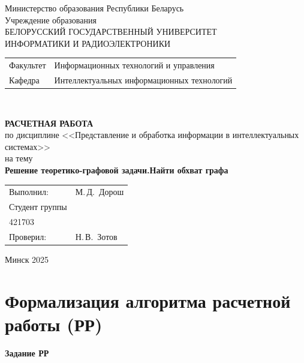\documentclass{article}
\begin{document}
\begin{titlepage}

  \begin{center}

    \vspace{6cm}
      Министерство образования Республики Беларусь\\[1em]
    Учреждение образования\\
    БЕЛОРУССКИЙ ГОСУДАРСТВЕННЫЙ УНИВЕРСИТЕТ \\
    ИНФОРМАТИКИ И РАДИОЭЛЕКТРОНИКИ\\[1em]

  \begin{minipage}{\textwidth}
      \begin{flushleft}
        \begin{tabular}{ l l }
          Факультет & Информационных технологий и управления\\
          Кафедра   & Интеллектуальных информационных технологий
        \end{tabular}
      \end{flushleft}
    \end{minipage}\\[1em]

    
    \vspace{5em}


    \textbf{РАСЧЕТНАЯ РАБОТА}\\
    {по дисциплине <<Представление и обработка информации в интеллектуальных системах>>}\\
    на тему\\
    \textbf{\large Решение теоретико-графовой задачи.Найти обхват графа}\\[1em]

    \vspace{10em}
    
    \begin{tabular}{ p{}p{} }
      Выполнил:& М.\,Д.~Дорош \\[1em]
      Студент группы& \\
      421703 & \\
      Проверил: & Н.\,В.~Зотов \\
     
    \end{tabular}
    
    \vfill
    {\normalsize Минск 2025}
  \end{center}
\end{titlepage}
\newpage 
\section{Формализация алгоритма расчетной работы (РР)}
\textbf{Задание РР} 
\end{document}
